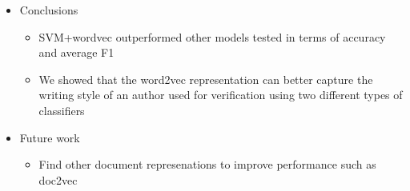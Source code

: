 \documentclass[paperwidth=47in,paperheight=71in,final, 16pt]{baposter}
\begin{document}
\begin{poster}
{\begin{itemize}

\item Conclusions
\begin{itemize}
\item SVM+wordvec outperformed other models tested in terms of accuracy and average F1
\item We showed that the word2vec representation can better capture the writing style of an author used for verification using two different types of classifiers

\end{itemize}

\item Future work
\begin{itemize}
\item Find other document represenations to improve performance such as doc2vec
\end{itemize}

\end{itemize}

}




\end{poster}%
\end{document}
